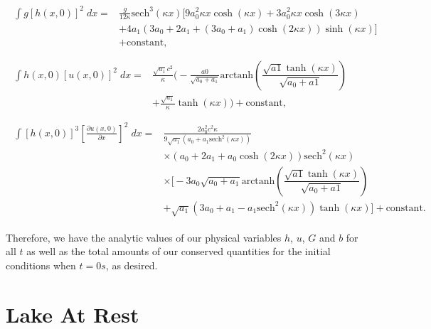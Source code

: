 \begin{align*}
\begin{split}
\int g\left[h(x,0)\right]^2 \; dx ={}& \frac{g}{12 \kappa }\text{sech}^3\left(\kappa x\right) \Bigg[9a_0^2 \kappa x \cosh\left(\kappa x\right) + 3 a_0^2 \kappa x \cosh\left(3\kappa x\right) \\ &+ 4 a_1 \left(3a_0 + 2 a_1 + \left(3a_0 + a_1\right)\cosh\left(2\kappa x\right)\right) \sinh\left(\kappa x\right)\Bigg] \\ &+ \text{constant},
\end{split}\\ \\
\begin{split}
\int h(x,0)\left[u(x,0)\right]^2 \; dx = {}& \frac{\sqrt{a_1}c^2}{\kappa} \Bigg( -\frac{a0}{\sqrt{a_0 + a_1}} \text{arctanh}\left(\dfrac{\sqrt{a1} \tanh\left(\kappa x\right)}{\sqrt{a_0 + a1}}\right)\\ &+ \frac{\sqrt{a_1}}{\kappa}\tanh\left(\kappa x\right)\Bigg)  + \text{constant},
\end{split} 
\\ \\
\begin{split}
\int \left[h(x,0)\right]^3 \left[\frac{\partial u(x,0)}{\partial x}\right]^2 \; dx = {}& \frac{2a_0^2c^2 \kappa }{9 \sqrt{a_1} \left(a_0 + a_1\text{sech}^2\left(\kappa x \right) \right)}   \\ &\times\left(a_0 + 2a_1 + a_0 \cosh\left(2\kappa x\right) \right) \text{sech}^2\left(\kappa x\right) \\&\times \Bigg[-3 a_0 \sqrt{a_0 + a_1}\text{arctanh}\left(\dfrac{\sqrt{a1} \tanh\left(\kappa x\right)}{\sqrt{a_0 + a1}}\right)  \\ &+ \sqrt{a_1}\left(3a_0 + a_1 - a_1\text{sech}^2\left(\kappa x\right)\right)\tanh(\kappa x) \Bigg]+ \text{constant}.
\end{split}
\end{align*}

Therefore, we have the analytic values of our physical variables $h$, $u$, $G$ and $b$ for all $t$ as well as the total amounts of our conserved quantities for the initial conditions when $t=0s$, as desired.

\section{Lake At Rest}

